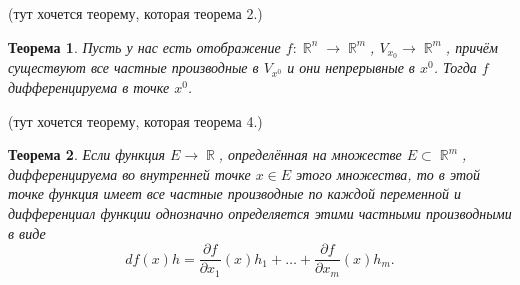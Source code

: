 \documentclass[a4paper,100pt]{article}
\theoremstyle{indented}
\newtheorem{theorem}{Теорема}
\theoremstyle{definition}
\theoremstyle{remark}
\DeclareMathOperator{\RR}{\mathbb{R}}
\begin{document}
(тут хочется теорему, которая теорема 2.) \\

\begin{theorem}
    Пусть у нас есть отображение $f:\RR^n\rightarrow \RR^m$, $V_{x_0}\rightarrow \RR^m$, причём существуют все частные производные в $V_{x^0}$ и они непрерывные в $x^0$. Тогда $f$ дифференцируема в точке $x^0$. 
\end{theorem}

(тут хочется теорему, которая теорема 4.) \\

\begin{theorem}
    Если функция $E\rightarrow \RR$, определённая на множестве $E\subset \RR^m$, дифференцируема во внутренней точке $x\in E$ этого множества, то в этой точке функция имеет все частные производные по каждой переменной и дифференциал функции однозначно определяется этими частными производными в виде
    \[
      df(x)h=\frac{\partial f}{\partial x_1}(x)h_1+\ldots+\frac{\partial f}{\partial x_m}(x)h_m. 
    \]
  \end{theorem}
\end{document}
